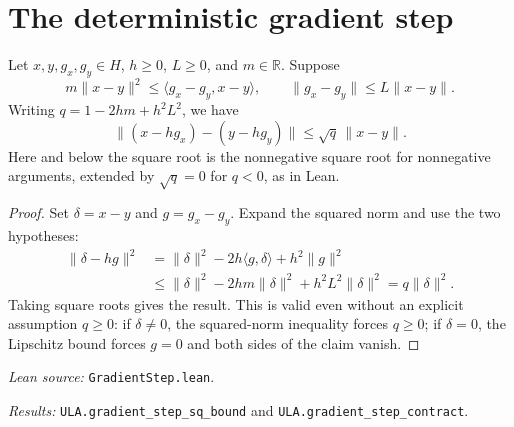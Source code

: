 \section{The deterministic gradient step}
\begin{lemma}\label{lem:step}
Let $x,y,g_x,g_y\in H$, $h\ge0$, $L\ge0$, and $m\in\mathbb R$.
Suppose
\[
 m\|x-y\|^2\le\langle g_x-g_y,x-y\rangle,
 \qquad \|g_x-g_y\|\le L\|x-y\|.
\]
Writing $q=1-2hm+h^2L^2$, we have
\[
 \|(x-hg_x)-(y-hg_y)\|\le\sqrt q\,\|x-y\|.
\]
Here and below the square root is the nonnegative square root for
nonnegative arguments, extended by $\sqrt q=0$ for $q<0$, as in Lean.
\end{lemma}
\begin{proof}
Set $\delta=x-y$ and $g=g_x-g_y$. Expand the squared norm and use
the two hypotheses:
\begin{align*}
 \|\delta-hg\|^2
 &=\|\delta\|^2-2h\langle g,\delta\rangle+h^2\|g\|^2\\
 &\le\|\delta\|^2-2hm\|\delta\|^2+h^2L^2\|\delta\|^2
 =q\|\delta\|^2.
\end{align*}
Taking square roots gives the result. This is valid even without an
explicit assumption $q\ge0$: if $\delta\ne0$, the squared-norm
inequality forces $q\ge0$; if $\delta=0$, the Lipschitz bound forces
$g=0$ and both sides of the claim vanish.
\end{proof}
{\small\raggedright
\textit{Lean source:} \texttt{GradientStep.lean}.\par
\textit{Results:}
\texttt{ULA.gradient\_step\_sq\_bound} and
\texttt{ULA.gradient\_step\_contract}.\par}
